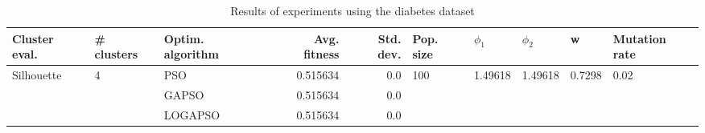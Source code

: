 \begin{table}
\centering
\caption{Results of experiments using the diabetes dataset}
\begin{tabular}{lllrrlllll}
\toprule
              Cluster eval. &        \# clusters & Optim. algorithm &  Avg. fitness &  Std. dev. &            Pop. size &               $\phi_{1}$ &               $\phi_{2}$ &                       w &         Mutation rate \\
\midrule
\multirow{3}{*}{Silhouette} & \multirow{3}{*}{4} &              PSO &      0.515634 &        0.0 & \multirow{3}{*}{100} & \multirow{3}{*}{1.49618} & \multirow{3}{*}{1.49618} & \multirow{3}{*}{0.7298} & \multirow{3}{*}{0.02} \\
                            &                    &            GAPSO &      0.515634 &        0.0 &                      &                          &                          &                         &                       \\
                            &                    &          LOGAPSO &      0.515634 &        0.0 &                      &                          &                          &                         &                       \\
\bottomrule
\end{tabular}
\end{table}
